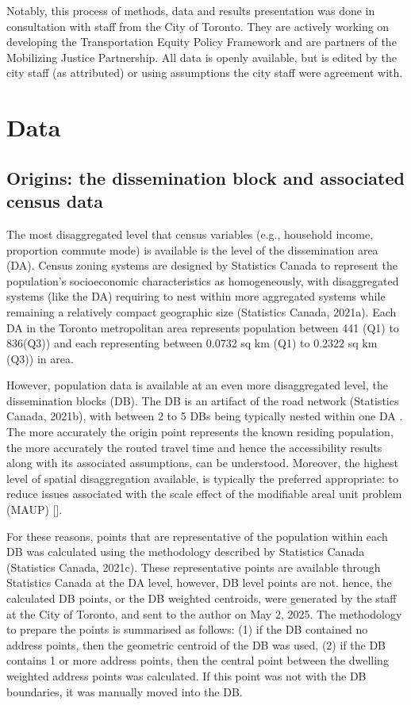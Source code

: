 \documentclass[
11pt, %
oneside, %
english, %
singlespacing, %
]{macthesis} %
\begin{document}
Notably, this process of methods, data and results presentation was done in consultation with staff from the City of Toronto. They are actively working on developing the Transportation Equity Policy Framework and are partners of the Mobilizing Justice Partnership. All data is openly available, but is edited by the city staff (as attributed) or using assumptions the city staff were agreement with.

\section{Data}\label{data}

\subsection{Origins: the dissemination block and associated census data}\label{origins-the-dissemination-block-and-associated-census-data}

The most disaggregated level that census variables (e.g., household income, proportion commute mode) is available is the level of the dissemination area (DA). Census zoning systems are designed by Statistics Canada to represent the population's socioeconomic characteristics as homogeneously, with disaggregated systems (like the DA) requiring to nest within more aggregated systems while remaining a relatively compact geographic size (Statistics Canada, 2021a). Each DA in the Toronto metropolitan area represents population between 441 (Q1) to 836(Q3)) and each representing between 0.0732 sq km (Q1) to 0.2322 sq km (Q3)) in area.

However, population data is available at an even more disaggregated level, the dissemination blocks (DB). The DB is an artifact of the road network (Statistics Canada, 2021b), with between 2 to 5 DBs being typically nested within one DA . The more accurately the origin point represents the known residing population, the more accurately the routed travel time and hence the accessibility results along with its associated assumptions, can be understood. Moreover, the highest level of spatial disaggregation available, is typically the preferred appropriate: to reduce issues associated with the scale effect of the modifiable areal unit problem (MAUP) {[}{]}.

For these reasons, points that are representative of the population within each DB was calculated using the methodology described by Statistics Canada (Statistics Canada, 2021c). These representative points are available through Statistics Canada at the DA level, however, DB level points are not. hence, the calculated DB points, or the DB weighted centroids, were generated by the staff at the City of Toronto, and sent to the author on May 2, 2025. The methodology to prepare the points is summarised as follows: (1) if the DB contained no address points, then the geometric centroid of the DB was used, (2) if the DB contains 1 or more address points, then the central point between the dwelling weighted address points was calculated. If this point was not with the DB boundaries, it was manually moved into the DB.
\end{document}
